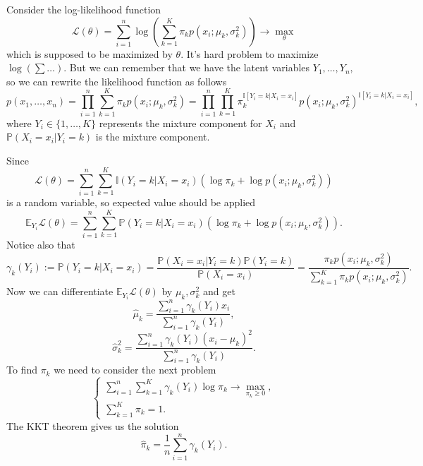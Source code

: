 \documentclass[a4paper, 12pt]{article}
\begin{document}
Consider the log-likelihood function
$$
\mathcal{L}(\theta) = \sum \limits_{i=1}^n \log \left( \sum \limits_{k=1}^K \pi_k p(x_i; \mu_k, \sigma^2_k) \right) \rightarrow \max \limits_{\theta}
$$
which is supposed to be maximized by $\theta.$
It's hard problem to maximize $\log(\sum \ldots).$ But we can remember that we have the latent variables $Y_1, \ldots, Y_n,$ so we can rewrite the likelihood function as follows
$$
p(x_1, \ldots, x_n) = \prod \limits_{i=1}^n \sum \limits_{k=1}^K \pi_k p(x_i; \mu_k, \sigma^2_k) = \prod \limits_{i=1}^n \prod \limits_{k=1}^K \pi_k^{\mathbb{I}[Y_i = k|X_i = x_i]} p(x_i; \mu_k, \sigma^2_k)^{\mathbb{I}[Y_i = k|X_i = x_i]},
$$
where $ Y_i \in \{ 1, \ldots, K \}$ represents the mixture component for $X_i$ and $\mathbb{P}(X_i = x_i|Y_i = k)$ is the mixture component.

Since 
$$
\mathcal{L}(\theta) =  \sum \limits_{i=1}^n \sum \limits_{k=1}^K \mathbb{I}(Y_i = k|X_i = x_i) (\log \pi_k + \log p(x_i; \mu_k, \sigma^2_k))
$$ 
is a random variable, so expected value should be applied
$$
\mathbb{E}_{Y_i} \mathcal{L}(\theta) =  \sum \limits_{i=1}^n \sum \limits_{k=1}^K \mathbb{P}(Y_i = k|X_i = x_i) (\log \pi_k + \log p(x_i; \mu_k, \sigma^2_k)).
$$ 
Notice also that
$$
\gamma_k(Y_i) := \mathbb{P}(Y_i = k | X_i = x_i) = \dfrac{\mathbb{P}(X_i = x_i | Y_i = k) \mathbb{P}(Y_i = k)}{\mathbb{P}(X_i = x_i)} = \dfrac{\pi_k p(x_i; \mu_k, \sigma^2_k)}{\sum \limits_{k=1}^K \pi_k p(x_i; \mu_k, \sigma^2_k)}.
$$
Now we can differentiate $\mathbb{E}_{Y_i} \mathcal{L}(\theta)$ by $\mu_k, \sigma_k^2$ and get 
$$
\hat{\mu}_k = \dfrac{\sum \limits_{i=1}^n \gamma_k(Y_i) x_i}{\sum \limits_{i=1}^n \gamma_k(Y_i)},
$$
$$
\hat{\sigma}_k^2 = \dfrac{\sum \limits_{i=1}^n \gamma_k(Y_i) (x_i - \mu_k)^2}{\sum \limits_{i=1}^n \gamma_k(Y_i)}.
$$
To find $\pi_k$ we need to consider the next problem
$$
\begin{cases}
\sum \limits_{i=1}^n \sum \limits_{k=1}^K \gamma_k(Y_i) \log \pi_k \rightarrow \max \limits_{\pi_k \geqslant 0}, \\
\sum \limits_{k=1}^K \pi_k = 1.
\end{cases}
$$
The KKT theorem gives us the solution
$$
\hat{\pi}_k = \dfrac{1}{n} \sum \limits_{i=1}^n \gamma_k(Y_i).
$$
\end{document}
